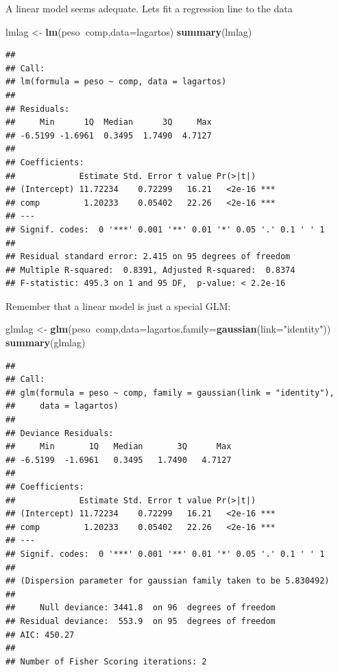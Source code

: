 \documentclass[
]{book}
\newenvironment{Shaded}{\begin{snugshade}}{\end{snugshade}}
\newcommand{\DataTypeTok}[1]{\textcolor[rgb]{0.13,0.29,0.53}{#1}}
\newcommand{\KeywordTok}[1]{\textcolor[rgb]{0.13,0.29,0.53}{\textbf{#1}}}
\newcommand{\NormalTok}[1]{#1}
\newcommand{\OperatorTok}[1]{\textcolor[rgb]{0.81,0.36,0.00}{\textbf{#1}}}
\newcommand{\StringTok}[1]{\textcolor[rgb]{0.31,0.60,0.02}{#1}}
\begin{document}
A linear model seems adequate. Lets fit a regression line to the data

\begin{Shaded}
\begin{Highlighting}[]
\NormalTok{lmlag <-}\StringTok{ }\KeywordTok{lm}\NormalTok{(peso}\OperatorTok{~}\NormalTok{comp,}\DataTypeTok{data=}\NormalTok{lagartos)}
\KeywordTok{summary}\NormalTok{(lmlag)}
\end{Highlighting}
\end{Shaded}

\begin{verbatim}
## 
## Call:
## lm(formula = peso ~ comp, data = lagartos)
## 
## Residuals:
##     Min      1Q  Median      3Q     Max 
## -6.5199 -1.6961  0.3495  1.7490  4.7127 
## 
## Coefficients:
##             Estimate Std. Error t value Pr(>|t|)    
## (Intercept) 11.72234    0.72299   16.21   <2e-16 ***
## comp         1.20233    0.05402   22.26   <2e-16 ***
## ---
## Signif. codes:  0 '***' 0.001 '**' 0.01 '*' 0.05 '.' 0.1 ' ' 1
## 
## Residual standard error: 2.415 on 95 degrees of freedom
## Multiple R-squared:  0.8391,	Adjusted R-squared:  0.8374 
## F-statistic: 495.3 on 1 and 95 DF,  p-value: < 2.2e-16
\end{verbatim}

Remember that a linear model is just a special GLM:

\begin{Shaded}
\begin{Highlighting}[]
\NormalTok{glmlag <-}\StringTok{ }\KeywordTok{glm}\NormalTok{(peso}\OperatorTok{~}\NormalTok{comp,}\DataTypeTok{data=}\NormalTok{lagartos,}\DataTypeTok{family=}\KeywordTok{gaussian}\NormalTok{(}\DataTypeTok{link=}\StringTok{"identity"}\NormalTok{))}
\KeywordTok{summary}\NormalTok{(glmlag)}
\end{Highlighting}
\end{Shaded}

\begin{verbatim}
## 
## Call:
## glm(formula = peso ~ comp, family = gaussian(link = "identity"), 
##     data = lagartos)
## 
## Deviance Residuals: 
##     Min       1Q   Median       3Q      Max  
## -6.5199  -1.6961   0.3495   1.7490   4.7127  
## 
## Coefficients:
##             Estimate Std. Error t value Pr(>|t|)    
## (Intercept) 11.72234    0.72299   16.21   <2e-16 ***
## comp         1.20233    0.05402   22.26   <2e-16 ***
## ---
## Signif. codes:  0 '***' 0.001 '**' 0.01 '*' 0.05 '.' 0.1 ' ' 1
## 
## (Dispersion parameter for gaussian family taken to be 5.830492)
## 
##     Null deviance: 3441.8  on 96  degrees of freedom
## Residual deviance:  553.9  on 95  degrees of freedom
## AIC: 450.27
## 
## Number of Fisher Scoring iterations: 2
\end{verbatim}
\end{document}
